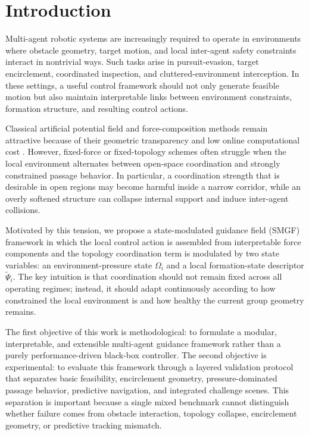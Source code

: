 \documentclass[utf8]{FrontiersinHarvard}
\begin{document}
\section{Introduction}

Multi-agent robotic systems are increasingly required to operate in environments where obstacle geometry, target motion, and local inter-agent safety constraints interact in nontrivial ways. Such tasks arise in pursuit-evasion, target encirclement, coordinated inspection, and cluttered-environment interception. In these settings, a useful control framework should not only generate feasible motion but also maintain interpretable links between environment constraints, formation structure, and resulting control actions.

Classical artificial potential field and force-composition methods remain attractive because of their geometric transparency and low online computational cost \citep{khatib1986,reynolds1987}. However, fixed-force or fixed-topology schemes often struggle when the local environment alternates between open-space coordination and strongly constrained passage behavior. In particular, a coordination strength that is desirable in open regions may become harmful inside a narrow corridor, while an overly softened structure can collapse internal support and induce inter-agent collisions.

Motivated by this tension, we propose a state-modulated guidance field (SMGF) framework in which the local control action is assembled from interpretable force components and the topology coordination term is modulated by two state variables: an environment-pressure state $\Omega_i$ and a local formation-state descriptor $\tilde{\Psi}_i$. The key intuition is that coordination should not remain fixed across all operating regimes; instead, it should adapt continuously according to how constrained the local environment is and how healthy the current group geometry remains.

The first objective of this work is methodological: to formulate a modular, interpretable, and extensible multi-agent guidance framework rather than a purely performance-driven black-box controller. The second objective is experimental: to evaluate this framework through a layered validation protocol that separates basic feasibility, encirclement geometry, pressure-dominated passage behavior, predictive navigation, and integrated challenge scenes. This separation is important because a single mixed benchmark cannot distinguish whether failure comes from obstacle interaction, topology collapse, encirclement geometry, or predictive tracking mismatch.
\end{document}
